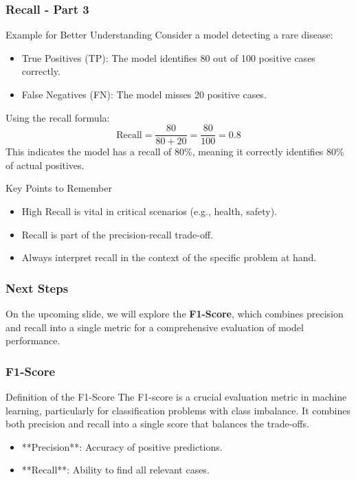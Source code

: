 \documentclass[aspectratio=169]{beamer}
\begin{document}
\begin{frame}[fragile]
    \frametitle{Recall - Part 3}
    \begin{block}{Example for Better Understanding}
        Consider a model detecting a rare disease:
        \begin{itemize}
            \item True Positives (TP): The model identifies 80 out of 100 positive cases correctly.
            \item False Negatives (FN): The model misses 20 positive cases.
        \end{itemize}
        Using the recall formula:
        \begin{equation}
            \text{Recall} = \frac{80}{80 + 20} = \frac{80}{100} = 0.8
        \end{equation}
        This indicates the model has a recall of 80\%, meaning it correctly identifies 80\% of actual positives.
    \end{block}

    \begin{block}{Key Points to Remember}
        \begin{itemize}
            \item High Recall is vital in critical scenarios (e.g., health, safety).
            \item Recall is part of the precision-recall trade-off.
            \item Always interpret recall in the context of the specific problem at hand.
        \end{itemize}
    \end{block}
\end{frame}

\begin{frame}[fragile]
    \frametitle{Next Steps}
    On the upcoming slide, we will explore the \textbf{F1-Score}, which combines precision and recall into a single metric for a comprehensive evaluation of model performance.
\end{frame}

\begin{frame}[fragile]
    \frametitle{F1-Score}
    \begin{block}{Definition of the F1-Score}
        The F1-score is a crucial evaluation metric in machine learning, particularly for classification problems with class imbalance. It combines both precision and recall into a single score that balances the trade-offs.
    \end{block}
    \begin{itemize}
        \item **Precision**: Accuracy of positive predictions.
        \item **Recall**: Ability to find all relevant cases.
    \end{itemize}
\end{frame}
\end{document}

